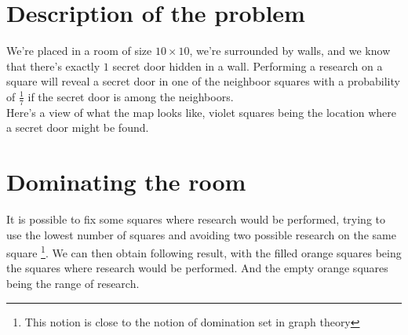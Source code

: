 \documentclass{article}
\begin{document}
\section{Description of the problem}
We're placed in a room of size $10 \times 10$, we're surrounded by walls, and
we know that there's exactly $1$ secret door hidden in a wall. Performing a
research on a square will reveal a secret door in one of the neighboor squares
with a probability of $\frac{1}{7}$ if the secret door is among the neighboors.
\\
Here's a view of what the map looks like, violet squares being the location
where a secret door might be found.


\begin{center}
\end{center}

\section{Dominating the room}
It is possible to fix some squares where research would be performed, trying to
use the lowest number of squares and avoiding two possible research on the
same square \footnote{This notion is close to the notion of domination set in
graph theory}. We can then obtain following result, with the filled orange squares
being the squares where research would be performed. And the empty orange squares
being the range of research.
\end{document}
